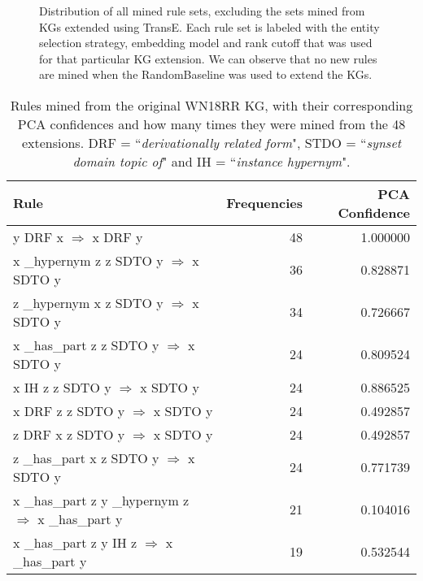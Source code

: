 \begin{figure}[htbp]
\centering
    \centering
    
    \caption[Dist. of all sets of mined rules, excluding TransE.]{Distribution of all mined rule sets, excluding the sets mined from KGs extended using TransE. Each rule set is labeled with the entity selection strategy, embedding model and rank cutoff that was used for that particular KG extension. We can observe that no new rules are mined when the RandomBaseline was used to extend the KGs.}
    \label{all_sets_w_out_TransE}
\end{figure}
\iffalse
\begin{table}
\begin{tabular}{lrr}
\toprule
                                                                                                      Rule &  Frequencies &  PCA Confidence \\
\midrule
                            y  DRF  x   $\Rightarrow$ x  DRF  y &           48 &        1.000000 \\
                   x  \_hypernym  z  z  SDTO  y   $\Rightarrow$ x  SDTO  y &           36 &        0.828871 \\
                   z  \_hypernym  x  z  SDTO  y   $\Rightarrow$ x  SDTO  y &           34 &        0.726667 \\
                   x  \_has\_part  z  z  SDTO  y   $\Rightarrow$ x  SDTO  y &           24 &        0.809524 \\
          x  IH  z  z  SDTO  y   $\Rightarrow$ x  SDTO  y &           24 &        0.886525 \\
x  DRF  z  z  SDTO  y   $\Rightarrow$ x  SDTO  y &           24 &        0.492857 \\
z  DRF  x  z  SDTO  y   $\Rightarrow$ x  SDTO  y &           24 &        0.492857 \\
                   z  \_has\_part  x  z  SDTO  y   $\Rightarrow$ x  SDTO  y &           24 &        0.771739 \\
                                               x  \_has\_part  z  y  \_hypernym  z   $\Rightarrow$ x  \_has\_part  y &           21 &        0.104016 \\
                                      x  \_has\_part  z  y  IH  z   $\Rightarrow$ x  \_has\_part  y &           19 &        0.532544 \\
\bottomrule
\end{tabular}
\caption{Rules mined from the original WN18RR KG, with their corresponding PCA confidences and how many times they were mined from the 48 extensions. DRF = ``\textit{derivationally related form}", STDO = ``\textit{synset domain topic of}" and IH = ``\textit{instance hypernym}".}
\label{wn18rr_original_rules_table_frequencies}
\end{table}

